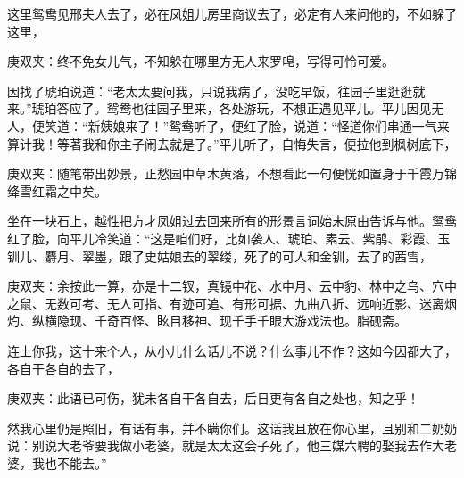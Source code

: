 \begin{parag}
    这里鸳鸯见邢夫人去了，必在凤姐儿房里商议去了，必定有人来问他的，不如躲了这里，\begin{note}庚双夹：终不免女儿气，不知躲在哪里方无人来罗唣，写得可怜可爱。\end{note}因找了琥珀说道：“老太太要问我，只说我病了，没吃早饭，往园子里逛逛就来。”琥珀答应了。鸳鸯也往园子里来，各处游玩，不想正遇见平儿。平儿因见无人，便笑道：“新姨娘来了！”鸳鸯听了，便红了脸，说道：“怪道你们串通一气来算计我！等著我和你主子闹去就是了。”平儿听了，自悔失言，便拉他到枫树底下，\begin{note}庚双夹：随笔带出妙景，正愁园中草木黄落，不想看此一句便恍如置身于千霞万锦绛雪红霜之中矣。\end{note}坐在一块石上，越性把方才凤姐过去回来所有的形景言词始末原由告诉与他。鸳鸯红了脸，向平儿冷笑道：“这是咱们好，比如袭人、琥珀、素云、紫鹃、彩霞、玉钏儿、麝月、翠墨，跟了史姑娘去的翠缕，死了的可人和金钏，去了的茜雪，\begin{note}庚双夹：余按此一算，亦是十二钗，真镜中花、水中月、云中豹、林中之鸟、穴中之鼠、无数可考、无人可指、有迹可追、有形可据、九曲八折、远响近影、迷离烟灼、纵横隐现、千奇百怪、眩目移神、现千手千眼大游戏法也。脂砚斋。\end{note}连上你我，这十来个人，从小儿什么话儿不说？什么事儿不作？这如今因都大了，各自干各自的去了，\begin{note}庚双夹：此语已可伤，犹未各自干各自去，后日更有各自之处也，知之乎！\end{note}然我心里仍是照旧，有话有事，并不瞒你们。这话我且放在你心里，且别和二奶奶说：别说大老爷要我做小老婆，就是太太这会子死了，他三媒六聘的娶我去作大老婆，我也不能去。”
\end{parag}


